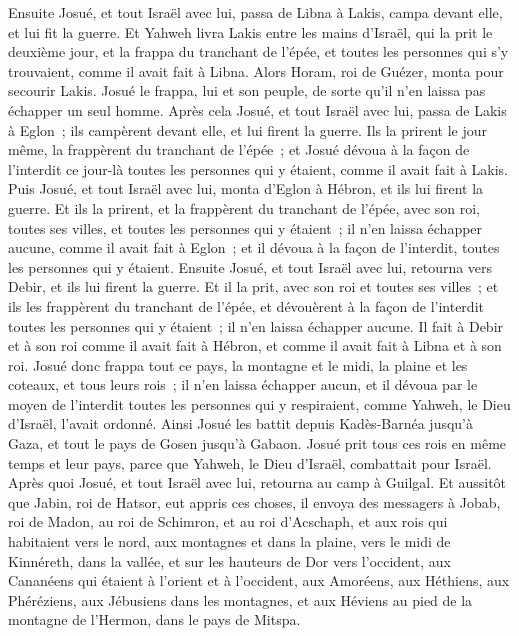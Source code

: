 \begin{multicols}{2}
Ensuite Josué, et tout Israël avec lui, passa de Libna à Lakis, campa devant elle, et lui fit la guerre.
Et Yahweh livra Lakis entre les mains d'Israël, qui la prit le deuxième jour, et la frappa du tranchant de l'épée, et toutes les personnes qui s'y trouvaient, comme il avait fait à Libna.
Alors Horam, roi de Guézer, monta pour secourir Lakis. Josué le frappa, lui et son peuple, de sorte qu'il n'en laissa pas échapper un seul homme.
Après cela Josué, et tout Israël avec lui, passa de Lakis à Eglon~; ils campèrent devant elle, et lui firent la guerre.
Ils la prirent le jour même, la frappèrent du tranchant de l'épée~; et Josué dévoua à la façon de l'interdit ce jour-là toutes les personnes qui y étaient, comme il avait fait à Lakis.
Puis Josué, et tout Israël avec lui, monta d'Eglon à Hébron, et ils lui firent la guerre.
Et ils la prirent, et la frappèrent du tranchant de l'épée, avec son roi, toutes ses villes, et toutes les personnes qui y étaient~; il n'en laissa échapper aucune, comme il avait fait à Eglon~; et il dévoua à la façon de l'interdit, toutes les personnes qui y étaient.
Ensuite Josué, et tout Israël avec lui, retourna vers Debir, et ils lui firent la guerre.
Et il la prit, avec son roi et toutes ses villes~; et ils les frappèrent du tranchant de l'épée, et dévouèrent à la façon de l'interdit toutes les personnes qui y étaient~; il n'en laissa échapper aucune. Il fait à Debir et à son roi comme il avait fait à Hébron, et comme il avait fait à Libna et à son roi.
Josué donc frappa tout ce pays, la montagne et le midi, la plaine et les coteaux, et tous leurs rois~; il n'en laissa échapper aucun, et il dévoua par le moyen de l'interdit toutes les personnes qui y respiraient, comme Yahweh, le Dieu d'Israël, l'avait ordonné.
Ainsi Josué les battit depuis Kadès-Barnéa jusqu'à Gaza, et tout le pays de Gosen jusqu'à Gabaon.
Josué prit tous ces rois en même temps et leur pays, parce que Yahweh, le Dieu d'Israël, combattait pour Israël.
Après quoi Josué, et tout Israël avec lui, retourna au camp à Guilgal.
\VerseOne{}Et aussitôt que Jabin, roi de Hatsor, eut appris ces choses, il envoya des messagers à Jobab, roi de Madon, au roi de Schimron, et au roi d'Acschaph,
et aux rois qui habitaient vers le nord, aux montagnes et dans la plaine, vers le midi de Kinnéreth, dans la vallée, et sur les hauteurs de Dor vers l'occident,
aux Cananéens qui étaient à l'orient et à l'occident, aux Amoréens, aux Héthiens, aux Phéréziens, aux Jébusiens dans les montagnes, et aux Héviens au pied de la montagne de l'Hermon, dans le pays de Mitspa.

\end{multicols}
